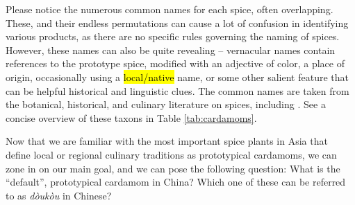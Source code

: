 \documentclass[12pt]{article}
\begin{document}
Please notice the numerous common names for each spice, often overlapping. These, and their endless permutations can cause a lot of confusion in identifying various products, as there are no specific rules governing the naming of spices. However, these names can also be quite revealing -- vernacular names contain references to the prototype spice, modified with an adjective of color, a place of origin, occasionally using a \hl{local/native} name, or some other salient feature that can be helpful historical and linguistic clues. The common names are taken from the botanical, historical, and culinary literature on spices, including \textcites{vanwyk_2014_culinary,hill_2004_contemporary,dalby_2000_dangerous,anderson_2023_history}. See a concise overview of these taxons in Table \ref{tab:cardamoms}.






Now that we are familiar with the most important spice plants in Asia that define local or regional culinary traditions as prototypical cardamoms, we can zone in on our main goal, and we can pose the following question: What is the ``default'', prototypical cardamom in China? Which one of these can be referred to as \textit{dòukòu} in Chinese?
\end{document}
